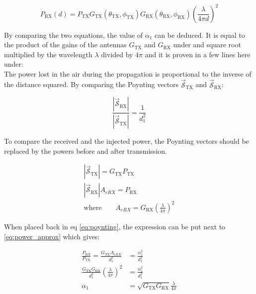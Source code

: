 \documentclass[10pt,a4paper]{ULBreport}
\begin{document}
\begin{equation}
    P_{\text{RX}}(d) = P_{\text{TX}} G_{\text{TX}}(\theta_{\text{TX}}, \phi_{\text{TX}})G_{\text{RX}}(\theta_{\text{RX}}, \phi_{\text{RX}})\left(\frac{\lambda}{4\pi d}\right)^2
    \label{eq:friis_formula}
\end{equation}

By comparing the two equations, the value of $\alpha_1$ can be deduced. It is equal to the product of the gains of the antennas $G_{\text{TX}}$ and $G_{\text{RX}}$ under and square root multiplied by the wavelength $\lambda$ divided by $4\pi$ and it is proven in a few lines here under:\smallskip\\
The power lost in the air during the propagation is proportional to the inverse of the distance squared. By comparing the Poynting vectors $\bm{\vec{\mathscr{S}}}_{\text{TX}}$ and $\bm{\vec{\mathscr{S}}}_{\text{RX}}$:

\begin{equation}
    \frac{\left|\bm{\vec{\mathscr{S}}}_{\text{RX}}\right|}{\left|\bm{\vec{\mathscr{S}}}_{\text{TX}}\right|} = \frac{1}{d_1^2}
    \label{eq:poynting}
\end{equation}

To compare the received and the injected power, the Poynting vectors should be replaced by the powers before and after transmission.
\vspace{-1cm}

\begin{align*}
    \left|\bm{\vec{\mathscr{S}}}_{\text{TX}}\right| = G_{\text{TX}} P_{\text{TX}}\\
    \left|\bm{\vec{\mathscr{S}}}_{\text{RX}}\right| A_{eRX} = P_{\text{RX}}\\
    \text{where} \quad \quad A_{eRX} = G_{\text{RX}}\left(\frac{\lambda}{4\pi}\right)^2
\end{align*}

When placed back in eq \ref{eq:poynting}, the expression can be put next to \ref{eq:power_approx} which gives:
\vspace{-1cm}

\begin{align*}
    \frac{P_{\text{RX}}}{P_{\text{TX}}} = \frac{G_{\text{TX}} A_{eRX}}{d_1^2} &= \frac{\alpha_1^2}{d_1^2}\\
    \frac{G_{\text{TX}} G_{\text{RX}}}{d_1^2} \left(\frac{\lambda}{4\pi}\right)^2 &= \frac{\alpha_1^2}{d_1^2}\\
    \alpha_1 &= \sqrt{G_{\text{TX}} G_{\text{RX}}} \frac{\lambda}{4\pi}
\end{align*}
\end{document}
